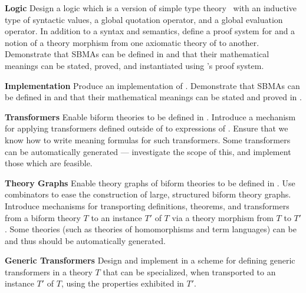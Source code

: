 \documentclass[fleqn]{llncs}
\begin{document}
\bi

  \item[]\textbf{Logic} Design a logic  which is a version
    of simple type theory~\cite{Farmer08} with an inductive type of
    syntactic values, a global quotation operator, and a global
    evaluation operator.  In addition to a syntax and semantics,
    define a proof system for  and a notion of a theory
    morphism from one axiomatic theory of  to another.
    Demonstrate that SBMAs can be defined in  and that
    their mathematical meanings can be stated, proved, and
    instantiated using 's proof system.

\medskip

  \item[]\textbf{Implementation} Produce an implementation  of
    .  Demonstrate that SBMAs can be defined in
     and that their mathematical meanings can be stated
    and proved in .

\medskip

  \item[]\textbf{Transformers} Enable biform theories to be defined in
    .  Introduce a mechanism for applying transformers
    defined outside of  to expressions of .
    Ensure that we know how to write meaning formulas for such
    transformers. Some transformers can be automatically generated
    --- investigate the scope of this, and implement those which
    are feasible.

\medskip

  \item[]\textbf{Theory Graphs} Enable theory graphs of biform
    theories to be defined in .  Use combinators to ease
    the construction of large, structured biform theory graphs.
    Introduce mechanisms for transporting definitions, theorems, and
    transformers from a biform theory $T$ to an instance $T'$ of $T$
    via a theory morphism from $T$ to $T'$. Some theories (such as
    theories of homomorphisms and term languages) can be and thus
    should be automatically generated.

\medskip

  \item[]\textbf{Generic Transformers} Design and implement in
     a scheme for defining generic transformers in a
    theory $T$ that can be specialized, when transported to an
    instance $T'$ of $T$, using the properties exhibited in $T'$.
\end{document}
